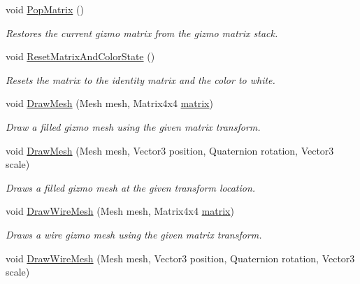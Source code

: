 \begin{DoxyCompactItemize}
void \mbox{\hyperlink{class_leap_1_1_unity_1_1_runtime_gizmos_1_1_runtime_gizmo_drawer_a6a0c428dd1c24aa043eabc5f4869d48e}{Pop\+Matrix}} ()
\begin{DoxyCompactList}\small\item\em Restores the current gizmo matrix from the gizmo matrix stack. \end{DoxyCompactList}\item 
void \mbox{\hyperlink{class_leap_1_1_unity_1_1_runtime_gizmos_1_1_runtime_gizmo_drawer_a92de6abecce2909ecf3acdc5e4e93e37}{Reset\+Matrix\+And\+Color\+State}} ()
\begin{DoxyCompactList}\small\item\em Resets the matrix to the identity matrix and the color to white. \end{DoxyCompactList}\item 
void \mbox{\hyperlink{class_leap_1_1_unity_1_1_runtime_gizmos_1_1_runtime_gizmo_drawer_abf1d16a9f0fdf0bc3d28c4d2d0084f81}{Draw\+Mesh}} (Mesh mesh, Matrix4x4 \mbox{\hyperlink{class_leap_1_1_unity_1_1_runtime_gizmos_1_1_runtime_gizmo_drawer_a816acf5a1da53536a8d86d050ca213b6}{matrix}})
\begin{DoxyCompactList}\small\item\em Draw a filled gizmo mesh using the given matrix transform. \end{DoxyCompactList}\item 
void \mbox{\hyperlink{class_leap_1_1_unity_1_1_runtime_gizmos_1_1_runtime_gizmo_drawer_adf5c5b247aef1a68afdcdabdd3254f1c}{Draw\+Mesh}} (Mesh mesh, Vector3 position, Quaternion rotation, Vector3 scale)
\begin{DoxyCompactList}\small\item\em Draws a filled gizmo mesh at the given transform location. \end{DoxyCompactList}\item 
void \mbox{\hyperlink{class_leap_1_1_unity_1_1_runtime_gizmos_1_1_runtime_gizmo_drawer_af700d140db83b67ab51956c436a76e82}{Draw\+Wire\+Mesh}} (Mesh mesh, Matrix4x4 \mbox{\hyperlink{class_leap_1_1_unity_1_1_runtime_gizmos_1_1_runtime_gizmo_drawer_a816acf5a1da53536a8d86d050ca213b6}{matrix}})
\begin{DoxyCompactList}\small\item\em Draws a wire gizmo mesh using the given matrix transform. \end{DoxyCompactList}\item 
void \mbox{\hyperlink{class_leap_1_1_unity_1_1_runtime_gizmos_1_1_runtime_gizmo_drawer_a38092dc098f2c70e15b14e671e3213a4}{Draw\+Wire\+Mesh}} (Mesh mesh, Vector3 position, Quaternion rotation, Vector3 scale)

\end{DoxyCompactItemize}
